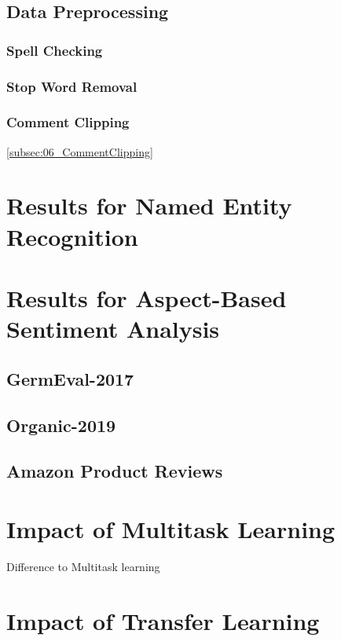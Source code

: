 \subsection{Data Preprocessing}
\label{subsec:06_dataPreprocessing}

\subsubsection{Spell Checking}

\subsubsection{Stop Word Removal}

\subsubsection{Comment Clipping}
\ref{subsec:06_CommentClipping}


\section{Results for Named Entity Recognition}

\section{Results for Aspect-Based Sentiment Analysis}

\subsection{GermEval-2017}

\subsection{Organic-2019}

\subsection{Amazon Product Reviews}

\section{Impact of Multitask Learning}
Difference to Multitask learning



\section{Impact of Transfer Learning}

